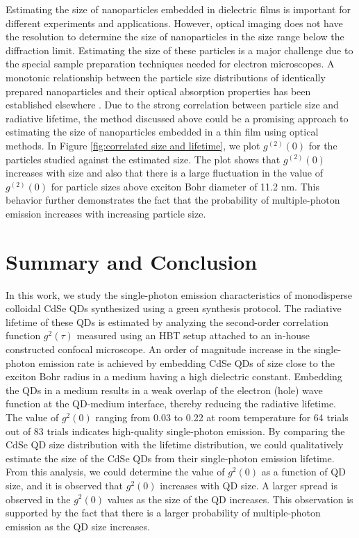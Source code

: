 \documentclass[%
 aip,
 amsmath,amssymb,
 reprint,%
]{revtex4-1}
\begin{document}
Estimating the size of nanoparticles embedded in dielectric films is important for different experiments and applications. However, optical imaging does not have the resolution to determine the size of nanoparticles in the size range below the diffraction limit. Estimating the size of these particles is a major challenge due to the special sample preparation techniques needed for electron microscopes. A monotonic relationship between the particle size distributions of identically prepared nanoparticles and their optical absorption properties has been established elsewhere \cite{AAT}.
Due to the strong correlation between particle size and radiative lifetime, the method discussed above could be a promising approach to estimating the size of nanoparticles embedded in a thin film using optical methods. 
In Figure \ref{fig:correlated size and lifetime}, we plot $g^{(2)} (0)$ for the particles studied against the estimated size. The plot shows that $g^{(2)} (0)$ increases with size and also that there is a large fluctuation in the value of $g^{(2)} (0)$ for particle sizes above exciton Bohr diameter of 11.2 nm. This behavior further demonstrates the fact that the probability of multiple-photon emission increases with increasing particle size. 



\section{Summary and Conclusion}
In this work, we study the single-photon emission characteristics of monodisperse colloidal CdSe QDs synthesized using a green synthesis protocol. The radiative lifetime of these QDs is estimated by analyzing the second-order correlation function $g^2(\tau)$ measured using an HBT setup attached to an in-house constructed confocal microscope. An order of magnitude increase in the single-photon emission rate is achieved by embedding CdSe QDs of size close to the exciton Bohr radius in a medium having a high dielectric constant. Embedding the QDs in a medium results in a weak overlap of the electron (hole) wave function at the QD-medium interface, thereby reducing the radiative lifetime. The value of $g^2(0)$ ranging from 0.03 to 0.22 at room temperature for 64 trials out of 83 trials indicates high-quality single-photon emission. By comparing the CdSe QD size distribution with the lifetime distribution, we could qualitatively estimate the size of the CdSe QDs from their single-photon emission lifetime. From this analysis, we could determine the value of $g^2(0)$ as a function of QD size, and it is observed that $g^2(0)$ increases with QD size. A larger spread is observed in the $g^2(0)$ values as the size of the QD increases. This observation is supported by the fact that there is a larger probability of multiple-photon emission as the QD size increases. 
\end{document}
